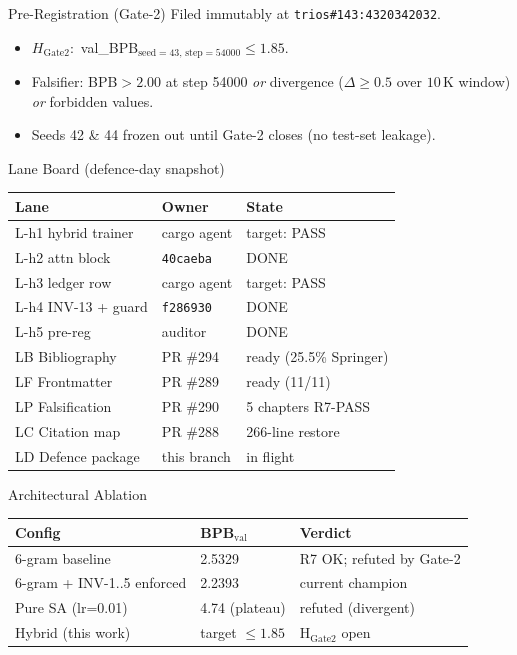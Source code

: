 \documentclass[10pt,aspectratio=169]{beamer}
\begin{document}
\begin{frame}{Pre-Registration (Gate-2)}
  Filed immutably at \texttt{trios\#143:4320342032}.
  \begin{itemize}
    \item $H_{\mathrm{Gate2}}\!:$ val\_BPB$_{\mathrm{seed}=43,\,\mathrm{step}=54000}\!\leq\!1{.}85$.
    \item Falsifier: BPB$>\!2{.}00$ at step 54000 \emph{or} divergence ($\Delta\!\geq\!0{.}5$ over $10$\,K window) \emph{or} forbidden values.
    \item Seeds 42 \& 44 frozen out until Gate-2 closes (no test-set leakage).
  \end{itemize}
\end{frame}

\begin{frame}{Lane Board (defence-day snapshot)}
  \begin{tabular}{lll}
    \toprule
    Lane & Owner & State \\
    \midrule
    L-h1 hybrid trainer & cargo agent & target: PASS \\
    L-h2 attn block     & \texttt{40caeba} & DONE \\
    L-h3 ledger row     & cargo agent & target: PASS \\
    L-h4 INV-13 + guard & \texttt{f286930} & DONE \\
    L-h5 pre-reg        & auditor & DONE \\
    LB Bibliography     & PR \#294 & ready (25.5\% Springer) \\
    LF Frontmatter      & PR \#289 & ready (11/11) \\
    LP Falsification    & PR \#290 & 5 chapters R7-PASS \\
    LC Citation map     & PR \#288 & 266-line restore \\
    LD Defence package  & this branch & in flight \\
    \bottomrule
  \end{tabular}
\end{frame}

\begin{frame}{Architectural Ablation}
  \begin{tabular}{lll}
    \toprule
    Config & BPB$_{\mathrm{val}}$ & Verdict \\
    \midrule
    6-gram baseline & 2.5329 & R7 OK; refuted by Gate-2 \\
    6-gram + INV-1..5 enforced & 2.2393 & current champion \\
    Pure SA (lr=0.01) & 4.74 (plateau) & refuted (divergent) \\
    Hybrid (this work) & target $\leq 1{.}85$ & H$_{\mathrm{Gate2}}$ open \\
    \bottomrule
  \end{tabular}
\end{frame}
\end{document}
